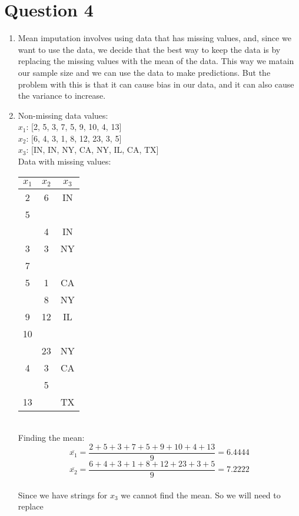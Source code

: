 \documentclass{article}
\begin{document}
\section*{Question 4}
\begin{enumerate}[label=\alph*)]
    \item Mean imputation involves using data that has missing values, and, since we want to use the data, we decide that the best way to keep the data is by replacing the missing values with the mean of the data.
    This way we matain our sample size and we can use the data to make predictions. But the problem with this is that it can cause bias in our data, and it can also cause the variance to increase.
    \item Non-missing data values:
    \\$x_1$: [2, 5, 3, 7, 5, 9, 10, 4, 13]
    \\ $x_2$: [6, 4, 3, 1, 8, 12, 23, 3, 5]
    \\ $x_3$: [IN, IN, NY, CA, NY, IL, CA, TX]
    \\ Data with missing values:
    \begin{table}[ht]
        \centering
        \begin{tabular}{|c|c|c|} 
        \hline
        $x_1$ & $x_2$ & $x_3$ \\
        \hline
        2 & 6 & IN \\\hline
        5 &  &  \\\hline
         & 4 & IN \\\hline
        3 & 3 & NY \\\hline
        7 &  &  \\\hline
        5 & 1 & CA \\\hline
         & 8 & NY \\\hline
        9 & 12 &  IL\\\hline
        10 &  &  \\\hline
         & 23 & NY \\\hline
        4 & 3 &  CA\\\hline
         & 5 &  \\\hline
        13 &  & TX \\\hline
        \end{tabular}
    \end{table}
    \\ Finding the mean:
    \[
        \overline{x_1} = \frac{2+5+3+7+5+9+10+4+13}{9} = 6.4444
    \]
    \[
        \overline{x_2} = \frac{6+4+3+1+8+12+23+3+5}{9} = 7.2222
    \]
    \\Since we have strings for $x_3$ we cannot find the mean. So we will need to replace 

\end{enumerate}
\end{document}
